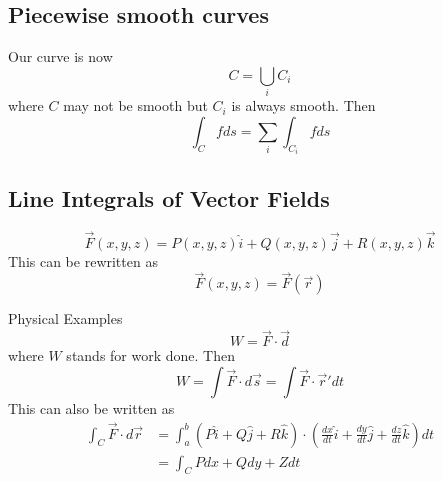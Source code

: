 \documentclass[12pt]{article}
\begin{document}
\subsection{Piecewise smooth curves}
Our curve is now
$$C = \bigcup_i C_i$$
where $C$ may not be smooth but $C_i$ is always smooth. Then
$$\int_C fds = \sum_i \int_{C_i} fds$$

\subsection{Line Integrals of Vector Fields}
$$\vec{F}(x,y,z) = P(x,y,z)\hat{i} + Q(x,y,z)\vec{j} + R(x,y,z)\vec{k}$$
This can be rewritten as
$$\vec{F}(x,y,z) = \vec{F}(\vec{r})$$

\begin{ex}
	Physical Examples
	$$W = \vec{F} \cdot \vec{d}$$
	where $W$ stands for work done. Then
	$$W = \int \vec{F} \cdot d\vec{s} = \int \vec{F} \cdot \vec{r}' dt$$
	This can also be written as
	\begin{align*}
		\int_C \vec{F} \cdot d\vec{r} &= \int_a^b (P\hat{i} + Q\hat{j} + R\hat{k}) \cdot \left(\frac{dx}{dt}\hat{i} + \frac{dy}{dt}\hat{j} + \frac{dz}{dt}\hat{k}\right)dt \\
					      &= \int_C Pdx + Qdy + Zdt
	\end{align*}
\end{ex}
\end{document}
